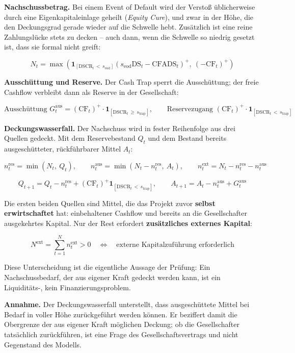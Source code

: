 \documentclass[
  a4paper,
  10pt]{article}
\renewenvironment{quote}
  {\begin{tcolorbox}[
      enhanced,
      breakable,
      colback=Wash,
      colframe=Brand,
      boxrule=0pt,
      leftrule=2.2pt,
      arc=0pt,
      left=8pt,right=8pt,top=6pt,bottom=6pt,
      before skip=8pt,after skip=9pt
    ]\small\color{InkSoft}}
  {\end{tcolorbox}}
\begin{document}
\textbf{Nachschussbetrag.} Bei einem Event of Default wird der Verstoß
üblicherweise durch eine Eigenkapitaleinlage geheilt (\emph{Equity
Cure}), und zwar in der Höhe, die den Deckungsgrad gerade wieder auf die
Schwelle hebt. Zusätzlich ist eine reine Zahlungslücke stets zu decken
-- auch dann, wenn die Schwelle so niedrig gesetzt ist, dass sie formal
nicht greift:

\[ N_t = \max\left( \mathbf{1}_{[\mathrm{DSCR}_t\, <\, s_{\mathrm{eod}}]} \left(s_{\mathrm{eod}} \mathrm{DS}_t - \mathrm{CFADS}_t\right)^{+},\ \left(-\mathrm{CF}_t\right)^{+} \right) \]

\textbf{Ausschüttung und Reserve.} Der Cash Trap sperrt die
Ausschüttung; der freie Cashflow verbleibt dann als Reserve in der
Gesellschaft:

\[ \text{Ausschüttung } G_t^{\mathrm{aus}} = \left(\mathrm{CF}_t\right)^{+} \cdot \mathbf{1}_{[\mathrm{DSCR}_t\, \geq\, s_{\mathrm{trap}}]}, \qquad \text{Reservezugang } \left(\mathrm{CF}_t\right)^{+} \cdot \mathbf{1}_{[\mathrm{DSCR}_t\, <\, s_{\mathrm{trap}}]} \]

\textbf{Deckungswasserfall.} Der Nachschuss wird in fester Reihenfolge
aus drei Quellen gedeckt. Mit dem Reservebestand \(Q_t\) und dem Bestand
bereits ausgeschütteter, rückführbarer Mittel \(A_t\):

\[ n^{\mathrm{res}}_t = \min(N_t,\ Q_t), \qquad n^{\mathrm{aus}}_t = \min\left(N_t - n^{\mathrm{res}}_t,\ A_t\right), \qquad n^{\mathrm{ext}}_t = N_t - n^{\mathrm{res}}_t - n^{\mathrm{aus}}_t \]

\[ Q_{t+1} = Q_t - n^{\mathrm{res}}_t + \left(\mathrm{CF}_t\right)^{+}\mathbf{1}_{[\mathrm{DSCR}_t\, <\, s_{\mathrm{trap}}]}, \qquad A_{t+1} = A_t - n^{\mathrm{aus}}_t + G_t^{\mathrm{aus}} \]

Die ersten beiden Quellen sind Mittel, die das Projekt zuvor
\textbf{selbst erwirtschaftet} hat: einbehaltener Cashflow und bereits
an die Gesellschafter ausgekehrtes Kapital. Nur der Rest erfordert
\textbf{zusätzliches externes Kapital}:

\[ N^{\mathrm{ext}} = \sum_{t=1}^{N} n^{\mathrm{ext}}_t > 0 \quad \Longleftrightarrow \quad \text{externe Kapitalzuführung erforderlich} \]

Diese Unterscheidung ist die eigentliche Aussage der Prüfung: Ein
Nachschussbedarf, der aus eigener Kraft gedeckt werden kann, ist ein
Liquiditäts-, kein Finanzierungsproblem.

\begin{quote}
\textbf{Annahme.} Der Deckungswasserfall unterstellt, dass
ausgeschüttete Mittel bei Bedarf in voller Höhe zurückgeführt werden
können. Er beziffert damit die Obergrenze der aus eigener Kraft
möglichen Deckung; ob die Gesellschafter tatsächlich zurückführen, ist
eine Frage des Gesellschaftsvertrags und nicht Gegenstand des Modells.
\end{quote}
\end{document}
